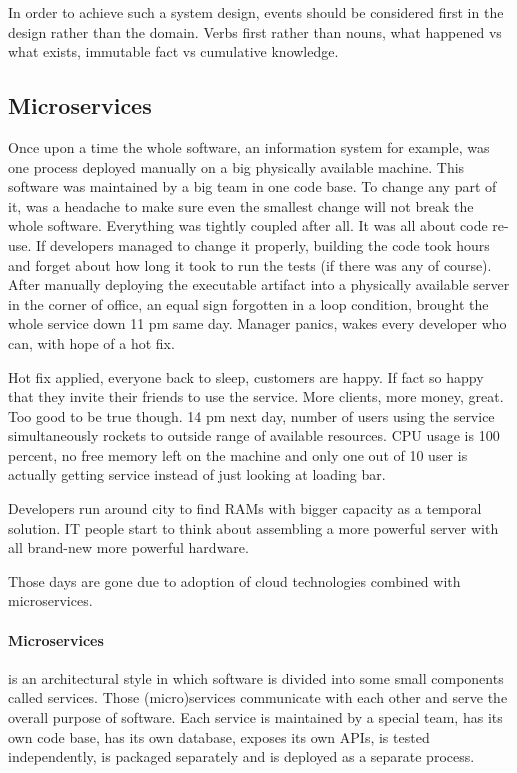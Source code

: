 \documentclass[a4]{report}
\begin{document}
    In order to achieve such a system design, events should be considered first in the design rather than the domain.
    Verbs first rather than nouns, what happened vs what exists, immutable fact vs cumulative knowledge.

    \subsection{Microservices}
    Once upon a time the whole software, an information system for example, was one process deployed manually on a big
    physically available machine.
    This software was maintained by a big team in one code base.
    To change any part of it, was a headache to make sure even the smallest change will not break the whole software.
    Everything was tightly coupled after all.
    It was all about code re-use.
    If developers managed to change it properly, building the code took hours and forget about how long it took to
    run the tests (if there was any of course).
    After manually deploying the executable artifact into a physically available server in the corner of office, an
    equal sign forgotten in a loop condition, brought the whole service down 11 pm same day.
    Manager panics, wakes every developer who can, with hope of a hot fix.

    Hot fix applied, everyone back to sleep, customers are happy.
    If fact so happy that they invite their friends to use the service.
    More clients, more money, great.
    Too good to be true though.
    14 pm next day, number of users using the service simultaneously rockets to outside range of available resources.
    CPU usage is 100 percent, no free memory left on the machine and only one out of 10 user is actually getting
    service instead of just looking at loading bar.

    Developers run around city to find RAMs with bigger capacity as a temporal solution.
    IT people start to think about assembling a more powerful server with all brand-new more powerful hardware.

    Those days are gone due to adoption of cloud technologies combined with microservices.

    \paragraph{Microservices} is an architectural style in which software is divided into some small components
    called services.
    Those (micro)services communicate with each other and serve the overall purpose of software.
    Each service is maintained by a special team, has its own code base, has its own database, exposes its own APIs, is
    tested independently, is packaged separately and is deployed as a separate process.
\end{document}

